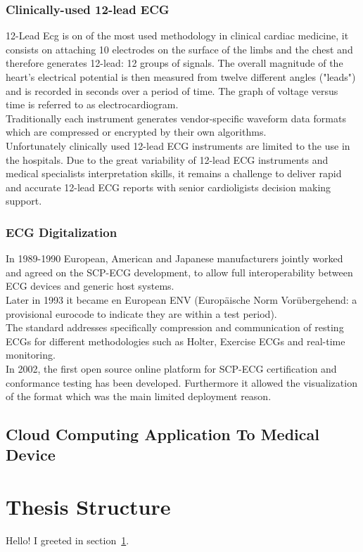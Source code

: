\subsubsection{Clinically-used 12-lead ECG}
12-Lead Ecg is on of the most used methodology in clinical cardiac medicine, it consists on attaching 10 electrodes on the surface of the limbs and the chest and therefore generates 12-lead: 12 groups of signals.\cite{Hsieh2012} The overall magnitude of the heart's electrical potential is then measured from twelve different angles ("leads") and is recorded in seconds over a period of time. The graph of voltage versus time is referred to as electrocardiogram.\cite{Electrocardiography}\\
Traditionally each instrument generates vendor-specific waveform data formats which are compressed or encrypted by their own algorithms.\\
Unfortunately clinically used 12-lead ECG instruments are limited to the use in the hospitals. Due to the great variability of 12-lead ECG instruments and medical specialists interpretation skills, it remains a challenge to deliver rapid and accurate 12-lead ECG reports with senior cardioligists decision making support.
\subsubsection{ECG Digitalization}
In 1989-1990 European, American and Japanese manufacturers jointly worked and agreed on the SCP-ECG development, to allow full interoperability between ECG devices and generic host systems.\\
Later in 1993 it became en European ENV (Europäische Norm Vorübergehend: a provisional eurocode to indicate they are within a test period).\\
The standard addresses specifically compression and communication of resting ECGs for different methodologies such as Holter, Exercise ECGs and real-time monitoring.\\
In 2002, the first open source online platform for SCP-ECG certification and conformance testing has been developed. Furthermore it allowed the visualization of the format which was the main limited deployment reason.\cite{Chronaki}\\

\subsection{Cloud Computing Application To Medical Device}


\section{Thesis Structure}
\label{sec:greetings}

Hello!
I greeted in section~\ref{sec:greetings}.